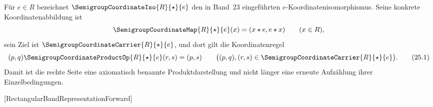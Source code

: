 \documentclass[main.tex]{subfiles}
\begin{document}
Für \(e\in R\) bezeichnet
\(\SemigroupCoordinateIso{R}{\star}{e}\) den in Band~23 eingeführten
\(e\)-Koordinatenisomorphismus.  Seine konkrete Koordinatenabbildung ist
\[
  \SemigroupCoordinateMap{R}{\star}{e}(x)
  =(x\star e,e\star x)\qquad(x\in R),
\]
sein Ziel ist
\(\SemigroupCoordinateCarrier{R}{\star}{e}\), und dort gilt die
Koordinatenregel
\[
  (p,q)\SemigroupCoordinateProductOp{R}{\star}{e}(r,s)=(p,s)
  \qquad
  \bigl((p,q),(r,s)\in
    \SemigroupCoordinateCarrier{R}{\star}{e}\bigr).       \tag{25.1}
\]
Damit ist die rechte Seite eine axiomatisch benannte Produktdarstellung
und nicht länger eine erneute Aufzählung ihrer Einzelbedingungen.

\ProofWideReasonsNearFormula
\begin{tabproofsplitwide}
  [RectangularBandRepresentationForward]
  \closeproofpartwideindR


\end{tabproofsplitwide}
\end{document}
